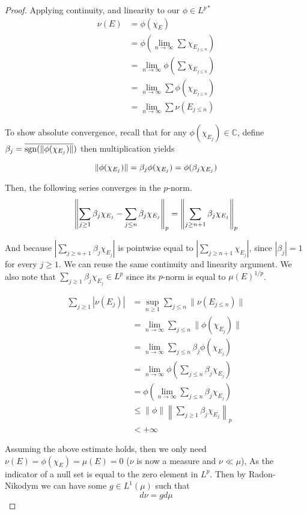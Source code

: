 \documentclass[../../main.tex]{subfiles}
\begin{document}
\begin{proof}
Applying continuity, and linearity to our $\phi\in L^{p*}$
\begin{align*}
    \nu(E) &= \phi(\chi_E)\\[2ex]
    &= \phi\left(\lim_{n\to\infty} \sum \chi_{E_{j\leq n}}\right)\\[2ex]
    &= \lim_{n\to\infty} \phi\left(\sum \chi_{E_{j\leq n}}\right)\\[2ex]
    &= \lim_{n\to\infty} \sum \phi\left(\chi_{E_{j\leq n}}\right)\\[2ex]
    &= \lim_{n\to\infty} \sum \nu(E_{j\leq n})
\end{align*}

To show absolute convergence, recall that for any $\phi(\chi_{E_j})\in\mathbb{C}$, define $\beta_j = \overline{\operatorname{sgn}(\lVert {\phi(\chi_{E_j})} \rVert})$ then multiplication yields

\[
\lVert {\phi(\chi_{E_j})} \rVert = \beta_j\phi(\chi_{E_j}) = \phi(\beta_j\chi_{E_j})
\]

Then, the following series converges in the $p$-norm.
\[
\left\lVert {\sum_{j\geq 1} \beta_j\chi_{E_j} - \sum_{j\leq n} \beta_j\chi_{E_j}} \right\rVert_p  = \left\lVert {\sum_{j\geq n+1} \beta_j\chi_{E_j}} \right\rVert_p
\]

And because $\left|\sum_{j\geq n+1} \beta_j\chi_{E_j}\right|$ is pointwise equal to $\left|\sum_{j\geq n+1} \chi_{E_j}\right|$, since $|\beta_j|=1$ for every $j\geq 1$. We can reuse the same continuity and linearity argument. We also note that $\sum_{j\geq 1} \beta_j\chi_{E_j}\in L^p$  since its $p$-norm is equal to $\mu(E)^{1/p}$.

\begin{align*}
    \sum_{j\geq 1} \left|\nu(E_j)\right|&=\sup_{n\geq 1} \sum_{j\leq n} \lVert \nu(E_{j\leq n})\rVert\\[1ex]
    &= \lim_{n\to\infty} \sum_{j\leq n} \lVert \phi(\chi_{E_j})\rVert\\[1ex]
    &= \lim_{n\to\infty} \sum_{j\leq n} \beta_j\phi(\chi_{E_j})\\[1ex]
    &= \lim_{n\to\infty} \phi\left(\sum_{j\leq n}\beta_j\chi_{E_j}\right)\\[2ex]
    &= \phi\left(\lim_{n\to\infty} \sum_{j\leq n}\beta_j\chi_{E_j}\right)\\[2ex]
    &\leq \lVert \phi \rVert \left\lVert \sum_{j\geq 1} \beta_j\chi_{E_j}\right\rVert_p\\[1ex]
    &< +\infty
\end{align*}

Assuming the above estimate holds, then we only need $\nu(E) = \phi(\chi_E) = \mu(E) = 0$ ($\nu$ is now a measure and $\nu\ll\mu$), As the indicator of a null set is equal to the zero element in $L^p$. Then by Radon-Nikodym we can have some $g\in L^1(\mu)$ such that 
\[
d\nu = gd\mu
\]


\end{proof}
\end{document}

